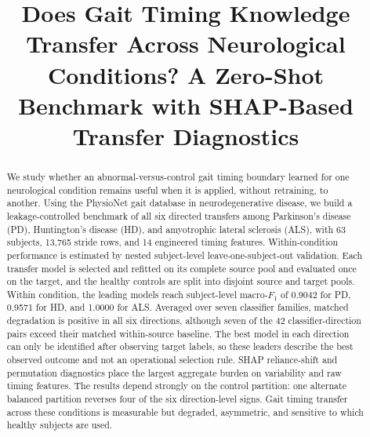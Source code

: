 \documentclass[conference]{IEEEtran}
\begin{document}
\raggedbottom

\title{Does Gait Timing Knowledge Transfer Across Neurological Conditions? A Zero-Shot Benchmark with SHAP-Based Transfer Diagnostics}

\author{
\and
{}
}

\maketitle

\begin{abstract}
We study whether an abnormal-versus-control gait timing boundary learned for one neurological condition remains useful when it is applied, without retraining, to another. Using the PhysioNet gait database in neurodegenerative disease, we build a leakage-controlled benchmark of all six directed transfers among Parkinson's disease (PD), Huntington's disease (HD), and amyotrophic lateral sclerosis (ALS), with 63 subjects, 13{,}765 stride rows, and 14 engineered timing features. Within-condition performance is estimated by nested subject-level leave-one-subject-out validation. Each transfer model is selected and refitted on its complete source pool and evaluated once on the target, and the healthy controls are split into disjoint source and target pools. Within condition, the leading models reach subject-level macro-$F_1$ of 0.9042 for PD, 0.9571 for HD, and 1.0000 for ALS. Averaged over seven classifier families, matched degradation is positive in all six directions, although seven of the 42 classifier-direction pairs exceed their matched within-source baseline. The best model in each direction can only be identified after observing target labels, so these leaders describe the best observed outcome and not an operational selection rule. SHAP reliance-shift and permutation diagnostics place the largest aggregate burden on variability and raw timing features. The results depend strongly on the control partition: one alternate balanced partition reverses four of the six direction-level signs. Gait timing transfer across these conditions is measurable but degraded, asymmetric, and sensitive to which healthy subjects are used.
\end{abstract}
\end{document}
